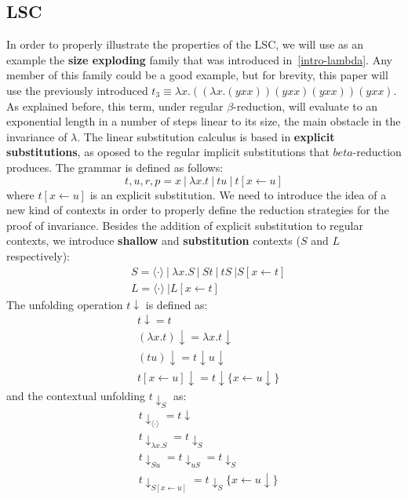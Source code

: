 \message{ !name(VU-CS-BSc-thesis-template.tex)}\documentclass[11pt]{article}
\begin{document}
\subsection{LSC}
In order to properly illustrate the properties of the LSC, we will use as an example the \textbf{size exploding} family that was introduced in~\ref{intro-lambda}. Any member of this family could be a good example, but for brevity, this paper will use the previously introduced $t_{3} \equiv \lambda x.((\lambda x. (yxx))(yxx)(yxx))(yxx)$. As explained before, this term, under regular $\beta$-reduction, will evaluate to an exponential length in a number of steps linear to its size, the main obstacle in the invariance of $\lambda$.
The linear substitution calculus is based in \textbf{explicit substitutions}, as oposed to the regular implicit substitutions that $beta$-reduction produces. The grammar is defined as follows:
\begin{equation}
  t, u, r, p = x \ | \ \lambda x.t \ | \ tu \ | \ t[x \leftarrow u]
\end{equation}
where $t[x \leftarrow u]$ is an explicit substitution.
We need to introduce the idea of a new kind of contexts in order to properly define the reduction strategies for the proof of invariance. Besides the addition of explicit substitution to regular contexts, we introduce \textbf{shallow} and \textbf{substitution} contexts ($S$ and $L$ respectively):
\begin{equation}
  \begin{split}
    &S = \langle \cdot \rangle \ | \ \lambda x.S \ | \ St \ | \ tS \ | S[x \leftarrow t] \\
    &L = \langle \cdot \rangle \ | L[x \leftarrow t]
  \end{split}
\end{equation}
The unfolding operation $t\downarrow$ is defined as:
\begin{equation}
  \begin{split}
    &t\downarrow = t \\
    &(\lambda x .t)\downarrow = \lambda x.t\downarrow \\
    &(tu)\downarrow = t\downarrow u \downarrow \\
    &t[x \leftarrow u]\downarrow = t\downarrow \{x \leftarrow u \downarrow \}
  \end{split}
\end{equation}
and the contextual unfolding $t\downarrow_S$ as:
\begin{equation}
  \begin{split}
    &t\downarrow_{\langle \cdot \rangle} = t\downarrow \\
    &t\downarrow_{\lambda x.S} = t\downarrow_S \\
    &t\downarrow_{Su} = t\downarrow_{uS} = t\downarrow_S \\
    &t\downarrow_{S[x \leftarrow u]} = t\downarrow_S \{x \leftarrow u \downarrow \}
  \end{split}
\end{equation}
\end{document}
